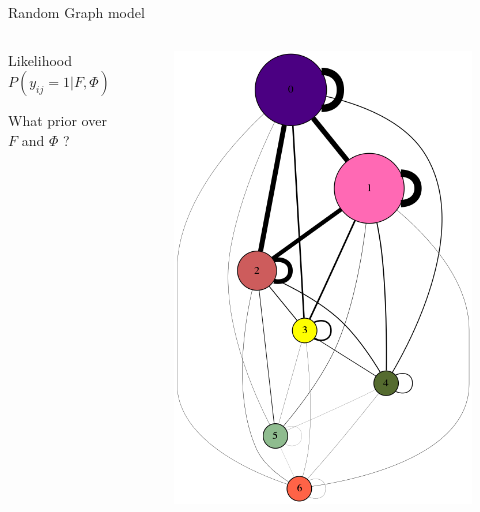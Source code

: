 \begin{frame}[t]{Random Graph model}
    \begin{columns}
        \begin{column}{0.5\textwidth}
            \begin{block}{Likelihood}
            \[ P(y_{ij}=1 | F, \Phi) = f_i \Phi f_j^T \]
            \end{block}
            What prior over $F$ and $\Phi$ ?
        \end{column}
        \begin{column}{0.5\textwidth}
        \begin{figure}[h]
        \includegraphics[scale=0.15]{img/gdot.png}
        \end{figure}
        \end{column}
    \end{columns}

\end{frame}


